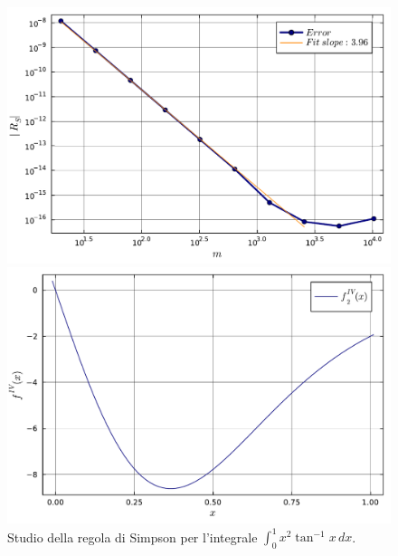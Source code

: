 \documentclass[letterpaper, 12pt]{article}
\numberwithin{equation}{section}    %
\begin{document}
\begin{figure}[!ht]
    \centering
    \begin{minipage}[b]{0.42\textwidth}
        \includegraphics[width=\textwidth]{5142.pdf}
    \end{minipage}
    \hspace{0.5cm}
    \begin{minipage}[b]{0.42\textwidth}
        \includegraphics[width=\textwidth]{5142_2.pdf}
    \end{minipage}
    \caption{Studio della regola di Simpson per l'integrale $\int_0^1 x^2 \tan^{-1}x\, dx$.}
    \label{fig:es5_1_4_2}
\end{figure}
\end{document}
